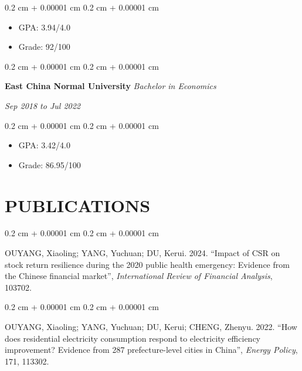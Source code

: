 \documentclass[10pt, letterpaper]{article}
\newenvironment{highlights}{
    \begin{itemize}[
        topsep=0.10 cm,
        parsep=0.10 cm,
        partopsep=0pt,
        itemsep=0pt,
        leftmargin=0.4 cm + 10pt
    ]
}{
    \end{itemize}
} %
\newenvironment{onecolentry}{
    \begin{adjustwidth}{
        0.2 cm + 0.00001 cm
    }{
        0.2 cm + 0.00001 cm
    }
}{
    \end{adjustwidth}
} %
\newenvironment{twocolentry}[2][]{
    \onecolentry
    \def\secondColumn{#2}
    \setcolumnwidth{\fill, 4.5 cm}
    \begin{paracol}{2}
}{
    \switchcolumn \raggedleft \secondColumn
    \end{paracol}
    \endonecolentry
} %
\newenvironment{paper}{\vspace{.2cm}\begin{samepage}\begin{onecolentry}}{\end{onecolentry}\end{samepage}\vspace{0.2cm}}
\begin{document}
\vspace{0.10 cm}

\begin{onecolentry}
	\begin{highlights}
		\item GPA: 3.94/4.0
		\item Grade: 92/100
	\end{highlights}
\end{onecolentry}

\vspace{0.2 cm}

\begin{twocolentry}{
		\textit{Sep 2018 to Jul 2022}}
	\textbf{East China Normal University}
	\textit{Bachelor in Economics}
\end{twocolentry}

\vspace{0.10 cm}

\begin{onecolentry}
	\begin{highlights}
		\item GPA: 3.42/4.0
		\item Grade: 86.95/100
	\end{highlights}
\end{onecolentry}


%
%
%

\section{PUBLICATIONS}

\begin{paper}
OUYANG, Xiaoling; YANG, Yuchuan; DU, Kerui. 2024. ``Impact of CSR on stock return resilience during the 2020 public health emergency: Evidence from the Chinese financial market'', \textit{International Review of Financial Analysis}, 103702.
\end{paper}

\begin{paper}
OUYANG, Xiaoling; YANG, Yuchuan; DU, Kerui; CHENG, Zhenyu. 2022. ``How does residential electricity consumption respond to electricity efficiency improvement? Evidence from 287 prefecture-level cities in China'', \textit{Energy Policy}, 171, 113302.
\end{paper}
\end{document}
